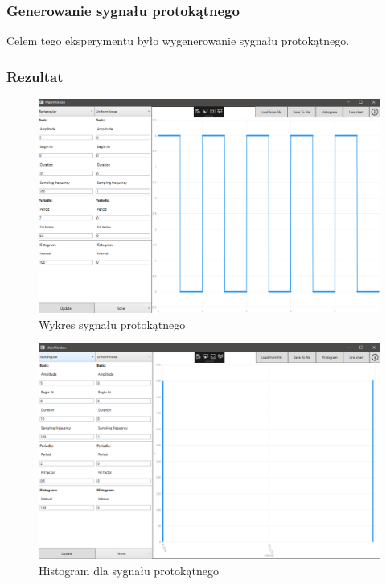 \documentclass[12pt]{article}
\begin{document}
\subsubsection{Generowanie sygnału protokątnego}
Celem tego eksperymentu było wygenerowanie sygnału protokątnego.


\subsubsection{Rezultat}

\begin{figure}[H]
 \centering
 \includegraphics[width=14cm]{images/rect1.PNG}
 \vspace{-0.3cm}
 \caption{Wykres sygnału protokątnego}
 \label{gui}
\end{figure}

\begin{figure}[H]
 \centering
 \includegraphics[width=14cm]{images/rect1hist.PNG}
 \vspace{-0.3cm}
 \caption{Histogram dla sygnału protokątnego}
 \label{gui}
\end{figure}
\end{document}
